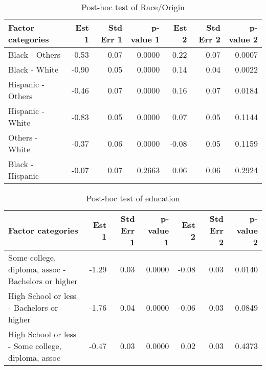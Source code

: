 \documentclass[11pt]{extarticle} %
\begin{document}
\begin{table}[H]
\footnotesize
\centering
\begin{tabular}{lrrrrrr}
  \hline
  Factor categories & Est 1 & Std Err 1 & p-value 1 & Est 2 & Std Err 2 & p-value 2 \\ 
  \hline
   Black - Others & -0.53 & 0.07 & 0.0000 & 0.22 & 0.07 & 0.0007 \\ 
   Black - White & -0.90 & 0.05 & 0.0000 & 0.14 & 0.04 & 0.0022 \\ 
   Hispanic - Others & -0.46 & 0.07 & 0.0000 & 0.16 & 0.07 & 0.0184 \\ 
   Hispanic - White & -0.83 & 0.05 & 0.0000 & 0.07 & 0.05 & 0.1144 \\ 
   Others - White & -0.37 & 0.06 & 0.0000 & -0.08 & 0.05 & 0.1159 \\ 
   Black - Hispanic & -0.07 & 0.07 & 0.2663 & 0.06 & 0.06 & 0.2924 \\ 
  \hline
\end{tabular}
\caption{Post-hoc test of Race/Origin} 
\label{tab:RaceOrigin}
\end{table}

\begin{table}[H]
\footnotesize
\centering
\begin{tabular}{lrrrrrr}
  \hline
  Factor categories & Est 1 & Std Err 1 & p-value 1 & Est 2 & Std Err 2 & p-value 2 \\ 
  \hline
   Some college, diploma, assoc - Bachelors or higher & -1.29 & 0.03 & 0.0000 & -0.08 & 0.03 & 0.0140 \\ 
   High School or less - Bachelors or higher & -1.76 & 0.04 & 0.0000 & -0.06 & 0.03 & 0.0849 \\ 
   High School or less - Some college, diploma, assoc & -0.47 & 0.03 & 0.0000 & 0.02 & 0.03 & 0.4373 \\ 
  \hline
\end{tabular}
\caption{Post-hoc test of education} 
\label{tab:Education}
\end{table}
\end{document}

